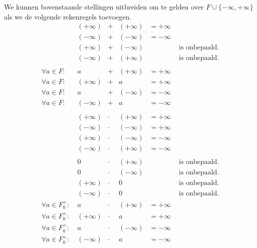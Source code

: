 \documentclass[main.tex]{subfiles}
\begin{document}
\begin{st}
  We kunnen bovenstaande stellingen uitbreiden om te gelden over $F\cup\{ -\infty,+\infty\}$ als we de volgende rekenregels toevoegen.
  \[
  \begin{array}{rccccl}
                             & (+\infty) &+    & (+\infty) &= +\infty\\
                             & (-\infty) &+    & (-\infty) &= -\infty\\
                             & (+\infty) &+    & (-\infty) & & \text{ is onbepaald.} \\
                             & (-\infty) &+    & (+\infty) & & \text{ is onbepaald.} \\\\

    \forall a \in F:\        & a         &+    & (+\infty) &= + \infty \\
    \forall a \in F:\        & (+\infty) &+    & a         &= + \infty \\
    \forall a \in F:\        & a         &+    & (-\infty) &= - \infty \\
    \forall a \in F:\        & (-\infty) &+    & a         &= - \infty \\\\

                             & (+\infty) &\cdot& (+\infty) &= +\infty\\
                             & (-\infty) &\cdot& (-\infty) &= +\infty\\
                             & (+\infty) &\cdot& (-\infty) &= -\infty\\
                             & (-\infty) &\cdot& (+\infty) &= -\infty\\\\

                             & 0         &\cdot& (+\infty) & & \text{ is onbepaald.} \\
                             & 0         &\cdot& (-\infty) & & \text{ is onbepaald.} \\
                             & (+\infty) &\cdot& 0         & & \text{ is onbepaald.} \\
                             & (-\infty) &\cdot& 0         & & \text{ is onbepaald.} \\
    \forall a \in F_{0}^{+}:\ & a         &\cdot& (+\infty) &= + \infty \\
    \forall a \in F_{0}^{+}:\ & (+\infty) &\cdot& a         &= + \infty \\
    \forall a \in F_{0}^{+}:\ & a         &\cdot& (-\infty) &= - \infty \\
    \forall a \in F_{0}^{+}:\ & (-\infty) &\cdot& a         &= - \infty \\\\


\end{array}\]
\end{st}
\end{document}
